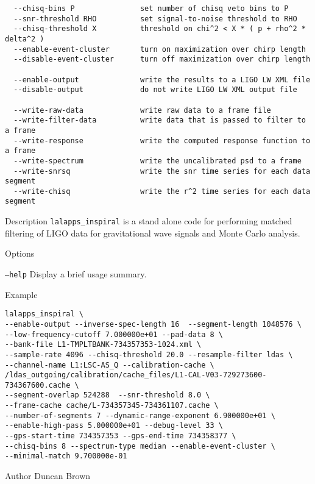 \begin{entry}
\begin{verbatim}
  --chisq-bins P               set number of chisq veto bins to P
  --snr-threshold RHO          set signal-to-noise threshold to RHO
  --chisq-threshold X          threshold on chi^2 < X * ( p + rho^2 * delta^2 )
  --enable-event-cluster       turn on maximization over chirp length
  --disable-event-cluster      turn off maximization over chirp length

  --enable-output              write the results to a LIGO LW XML file
  --disable-output             do not write LIGO LW XML output file

  --write-raw-data             write raw data to a frame file
  --write-filter-data          write data that is passed to filter to a frame
  --write-response             write the computed response function to a frame
  --write-spectrum             write the uncalibrated psd to a frame
  --write-snrsq                write the snr time series for each data segment
  --write-chisq                write the r^2 time series for each data segment
\end{verbatim}

\item[Description] 
\verb$lalapps_inspiral$ is a stand alone code for performing matched filtering
of LIGO data for gravitational wave signals and Monte Carlo analysis.

\item[Options]\leavevmode
\begin{entry}
\item[\texttt{--help}] Display a brief usage summary.
\end{entry}

\item[Example]
\begin{verbatim}
lalapps_inspiral \
--enable-output --inverse-spec-length 16  --segment-length 1048576 \
--low-frequency-cutoff 7.000000e+01 --pad-data 8 \
--bank-file L1-TMPLTBANK-734357353-1024.xml \
--sample-rate 4096 --chisq-threshold 20.0 --resample-filter ldas \
--channel-name L1:LSC-AS_Q --calibration-cache \
/ldas_outgoing/calibration/cache_files/L1-CAL-V03-729273600-734367600.cache \
--segment-overlap 524288  --snr-threshold 8.0 \
--frame-cache cache/L-734357345-734361107.cache \
--number-of-segments 7 --dynamic-range-exponent 6.900000e+01 \
--enable-high-pass 5.000000e+01 --debug-level 33 \
--gps-start-time 734357353 --gps-end-time 734358377 \
--chisq-bins 8 --spectrum-type median --enable-event-cluster \
--minimal-match 9.700000e-01
\end{verbatim}

\item[Author] 
Duncan Brown
\end{entry}
\clearpage

